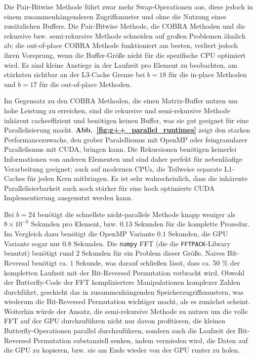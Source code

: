 \documentclass[10pt]{article}
\begin{document}
Die Pair-Bitwise Methode führt zwar  mehr Swap-Operationen aus, diese jedoch in einem zusammenhängenderen Zugriffsmuster 
und ohne die Nutzung eines zusätzlichen Buffers. Die Pair-Bitwise Methode, die COBRA Methoden und die rekursive bzw. semi-rekursive Methode
schneiden auf großen Problemen ähnlich ab; die out-of-place COBRA Methode funktioniert am besten, verliert jedoch ihren Vorsprung, wenn die 
Buffer-Größe nicht für die spezifische CPU optimiert wird. 
Es sind kleine Anstiege in der Laufzeit pro Element zu beobachten, am stärksten sichtbar an der L3-Cache Grenze bei $b=18$ für
die in-place Methoden und $b=17$ für die out-of-place Methoden. 

Im Gegensatz zu den COBRA Methoden, die einen Matrix-Buffer nutzen um hohe Leistung zu erreichen, sind die rekursive 
und semi-rekursive Methode inhärent cacheeffizient und benötigen keinen Buffer, was sie gut geeignet für eine Parallelisierung macht.
{\bf Abb.~\ref{fig:g++_parallel_runtimes}} zeigt den starken Performancezuwachs, den grober Paralellismus mit OpenMP oder 
feingranularer Parallelismus mit CUDA, bringen kann. Die Rekursionen benötigen keinerlei Informationen von anderen Elementen und sind daher
perfekt für nebenläufige Verarbeitung geeignet; auch auf modernen CPUs, die Teilweise separate L1-Caches für jeden Kern mitbringen.
Es ist sehr wahrscheinlich, dass die inhärente Parallelisierbarkeit auch noch stärker für eine hoch optimierte CUDA Implementierung 
ausgenutzt werden kann.

Bei $b=24$ benötigt die schnellste nicht-parallele Methode knapp weniger als $8 \times {10}^{-9}$ Sekunden pro Element, bzw. 0.13 Sekunden
für die komplette Prozedur. Im Vergleich dazu benötigt die OpenMP Variante $0.1$ Sekunden, die GPU Variante sogar nur $0.8$ Sekunden. 
Die {\tt numpy} FFT (die die {\tt FFTPACK}-Library benutzt) benötigt rund $2$ Sekunden für ein Problem dieser Größe. Naives Bit-Reversal benötigt
ca. $1$ Sekunde, was darauf schließen lässt, dass ca. 50 \% der kompletten Laufzeit mit der Bit-Reversed Permutation verbracht wird. 
Obwohl der Butterfly-Code der FFT kompliziertere Manipulationen komplexer Zahlen durchführt, geschieht das in 
zusammenhängenden Speicherzugriffsmustern, was wiederum die Bit-Reversed Permutation wichtiger macht, als es zunächst scheint.
Weiterhin würde der Ansatz, die semi-rekursive Methode zu nutzen um die volle FFT auf der GPU durchzuführen nicht nur davon profitieren, die kleinen
Butterfly-Operationen parallel durchzuführen, sondern auch die Laufzeit der Bit-Reversed Permutation substanziell senken, indem vermieden wird,
die Daten auf die GPU zu kopieren, bzw. sie am Ende wieder von der GPU runter zu holen.
\end{document}
